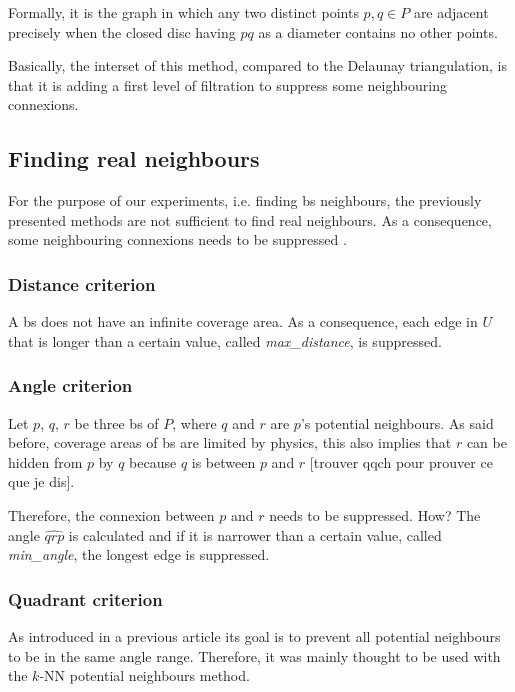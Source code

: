 \documentclass[lettersize,journal,english]{IEEEtran}
\begin{document}
            Formally, it is the graph in which any two distinct points $p, q \in P$ are adjacent precisely when the closed disc having $pq$ as a diameter contains no other points.

            Basically, the interset of this method, compared to the Delaunay triangulation, is that it is adding a first level of filtration to suppress some neighbouring connexions.

    \subsection{Finding real neighbours}
        For the purpose of our experiments, i.e. finding \acrshort{bs} neighbours, the previously presented methods are not sufficient to find real neighbours.
        As a consequence, some neighbouring connexions needs to be suppressed \cite{patent_neighs}.
        \subsubsection{Distance criterion}
            A \acrshort{bs} does not have an infinite coverage area.
            As a consequence, each edge in $U$ that is longer than a certain value, called \emph{max\_distance}, is suppressed.

        \subsubsection{Angle criterion}
            Let $p$, $q$, $r$ be three \acrshort{bs} of $P$, where $q$ and $r$ are $p$'s potential neighbours. As said before, coverage areas of \acrshort{bs} are limited by physics, this also implies that $r$ can be \og hidden\fg{} from $p$ by $q$ because $q$ is between $p$ and $r$ [trouver qqch pour prouver ce que je dis].

            Therefore, the connexion between $p$ and $r$ needs to be suppressed. How? The angle $\widehat{qrp}$ is calculated and if it is narrower than a certain value, called \emph{min\_angle}, the longest edge is suppressed.

        \subsubsection{Quadrant criterion}
            As introduced in a previous article \cite{10201211} its goal is to prevent all potential neighbours to be in the same angle range. Therefore, it was mainly thought to be used with the $k$-NN potential neighbours method.
\end{document}
